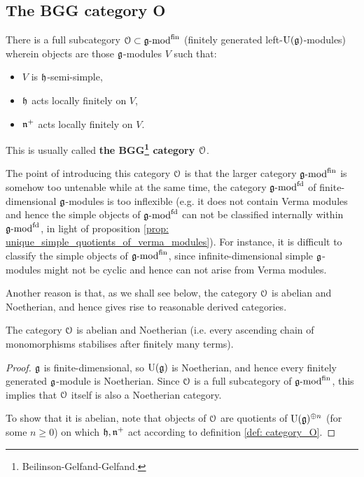     \subsection{The BGG category O}
        \begin{definition} \label{def: category_O}
            There is a full subcategory $\mathcal{O} \subset \mathfrak{g}\text{-}\mathrm{mod}^{\mathrm{fin}}$ (finitely generated left-$\mathrm{U}(\mathfrak{g})$-modules) wherein objects are those $\mathfrak{g}$-modules $V$ such that:
                \begin{itemize}
                    \item $V$ is $\mathfrak{h}$-semi-simple,
                    \item $\mathfrak{h}$ acts locally finitely on $V$,
                    \item $\mathfrak{n}^+$ acts locally finitely on $V$.
                \end{itemize}
            This is usually called \textbf{the BGG\footnote{Beilinson-Gelfand-Gelfand.} category $\mathcal{O}$}.
        \end{definition}
        \begin{remark}
            The point of introducing this category $\mathcal{O}$ is that the larger category $\mathfrak{g}\text{-}\mathrm{mod}^{\mathrm{fin}}$ is somehow too untenable while at the same time, the category $\mathfrak{g}\text{-}\mathrm{mod}^{\mathrm{fd}}$ of finite-dimensional $\mathfrak{g}$-modules is too inflexible (e.g. it does not contain Verma modules and hence the simple objects of $\mathfrak{g}\text{-}\mathrm{mod}^{\mathrm{fd}}$ can not be classified internally within $\mathfrak{g}\text{-}\mathrm{mod}^{\mathrm{fd}}$, in light of proposition \ref{prop: unique_simple_quotients_of_verma_modules}). For instance, it is difficult to classify the simple objects of $\mathfrak{g}\text{-}\mathrm{mod}^{\mathrm{fin}}$, since infinite-dimensional simple $\mathfrak{g}$-modules might not be cyclic and hence can not arise from Verma modules. 

            Another reason is that, as we shall see below, the category $\mathcal{O}$ is abelian and Noetherian, and hence gives rise to reasonable derived categories. 
        \end{remark}
        \begin{proposition} \label{prop: categorical_properties_of_the_category_O}
            The category $\mathcal{O}$ is abelian and Noetherian (i.e. every ascending chain of monomorphisms stabilises after finitely many terms).
        \end{proposition}
            \begin{proof}
                $\mathfrak{g}$ is finite-dimensional, so $\mathrm{U}(\mathfrak{g})$ is Noetherian, and hence every finitely generated $\mathfrak{g}$-module is Noetherian. Since $\mathcal{O}$ is a full subcategory of $\mathfrak{g}\text{-}\mathrm{mod}^{\mathrm{fin}}$, this implies that $\mathcal{O}$ itself is also a Noetherian category. 

                To show that it is abelian, note that objects of $\mathcal{O}$ are quotients of $\mathrm{U}(\mathfrak{g})^{\oplus n}$ (for some $n \geq 0$) on which $\mathfrak{h}, \mathfrak{n}^+$ act according to definition \ref{def: category_O}. 
            \end{proof}

